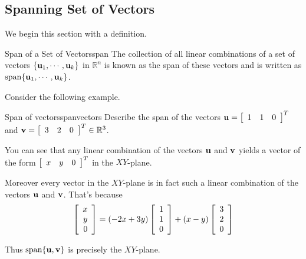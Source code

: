 \subsection{Spanning Set of Vectors}

We begin this section with a definition.

\begin{definition}{Span of a Set of Vectors}{span}
The collection of all linear combinations of a set of vectors $\{ {\bf u}_1,
\cdots ,{\bf u}_k\}$ in $\mathbb{R}^{n}$ is known as the span of these
vectors and is written as $\mbox{span} \{{\bf u}_1, \cdots , {\bf u}_k\}$.
\end{definition}

Consider the following example.

\begin{example}{Span of vectors}{spanvectors}
Describe the span of the vectors ${\bf u}=\left[ 
\begin{array}{rrr}
1  & 1 & 0
\end{array}
\right]^T$ and
${\bf v}=\left[ 
\begin{array}{rrr}
3  & 2 & 0
\end{array}
\right]^T \in \mathbb{R}^{3}$.
\end{example}

\begin{solution}
You can see that any linear combination of the vectors ${\bf u}$ and ${\bf v}$ yields a vector of the form 
$\left[ 
\begin{array}{rrr}
x  & y & 0
\end{array}
\right]^T$ in the $XY$-plane. 

Moreover every vector in the $XY$-plane is in fact such a linear
combination of the vectors ${\bf u}$ and ${\bf v}$. That's because
\[ \left[ 
\begin{array}{r}
x \\
y \\
 0
\end{array}
\right] 
=
(-2x+3y) \left[ 
\begin{array}{r}
1  \\
1 \\
0
\end{array}
\right]
+
(x-y)\left[ 
\begin{array}{r}
3 \\
2 \\
0
\end{array}
\right] 
\]

Thus  $\mbox{span}\{{\bf u},{\bf v}\}$ is precisely the $XY$-plane.
\end{solution}

